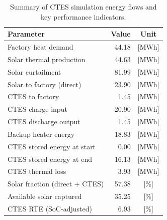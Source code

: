 \renewcommand{\arraystretch}{1.2}
\begin{table}[h]
\centering
\begin{tabular}{l|r c}
\hline
Parameter & Value & Unit \\
\hline
Factory heat demand & 44.18 & [MWh] \\
Solar thermal production & 44.63 & [MWh] \\
Solar curtailment & 81.99 & [MWh] \\
Solar to factory (direct) & 23.90 & [MWh] \\
CTES to factory & 1.45 & [MWh] \\
CTES charge input & 20.90 & [MWh] \\
CTES discharge output & 1.45 & [MWh] \\
Backup heater energy & 18.83 & [MWh] \\
CTES stored energy at start & 0.00 & [MWh] \\
CTES stored energy at end & 16.13 & [MWh] \\
CTES thermal loss & 3.93 & [MWh] \\
\hline
Solar fraction (direct + CTES) & 57.38 & [\%] \\
Available solar captured & 35.25 & [\%] \\
CTES RTE (SoC-adjusted) & 6.93 & [\%] \\
\hline
\end{tabular}
\caption{Summary of CTES simulation energy flows and key performance indicators.}
\label{tab:ctes-simulation-summary}
\end{table}
